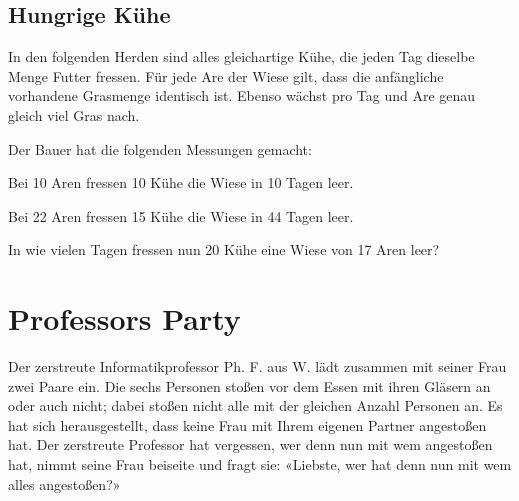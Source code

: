 \subsection{Hungrige Kühe}

In den folgenden Herden sind alles gleichartige Kühe, die jeden Tag dieselbe
Menge Futter fressen. Für jede Are der Wiese gilt, dass die anfängliche
vorhandene Grasmenge identisch ist. Ebenso wächst pro Tag und Are genau
gleich viel Gras nach.

Der Bauer hat die folgenden Messungen gemacht:

Bei 10 Aren fressen 10 Kühe die Wiese in 10 Tagen leer.

Bei 22 Aren fressen 15 Kühe die Wiese in 44 Tagen leer.

In wie vielen Tagen fressen nun 20 Kühe eine Wiese von 17 Aren leer?

\TNTeop{}


\section{Professors Party}

Der zerstreute Informatikprofessor Ph. F. aus W. lädt zusammen mit seiner Frau
zwei Paare ein. Die sechs Personen stoßen vor dem Essen mit ihren Gläsern an
oder auch nicht; dabei stoßen nicht alle mit der gleichen Anzahl Personen an. Es
hat sich herausgestellt, dass keine Frau mit Ihrem eigenen Partner angestoßen
hat. Der zerstreute Professor hat vergessen, wer denn nun mit wem angestoßen
hat, nimmt seine Frau beiseite und fragt sie: «Liebste, wer hat denn nun mit
wem alles angestoßen?»

